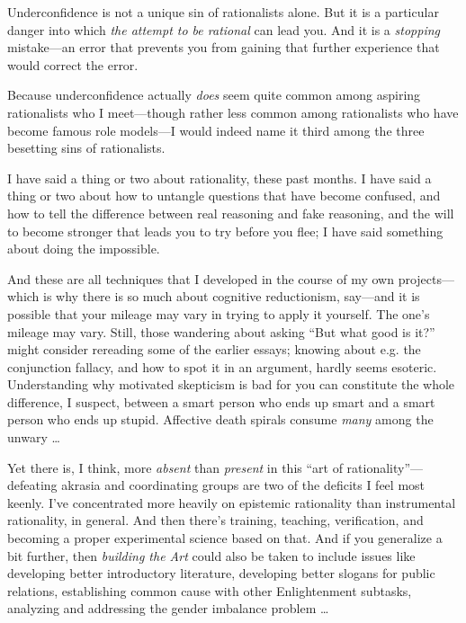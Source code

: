 {
 Underconfidence is not a unique sin of rationalists alone. But it
is a particular danger into which \textit{the attempt to be rational}
can lead you. And it is a \textit{stopping} mistake---an error that
prevents you from gaining that further experience that would correct
the error.}

{
 Because underconfidence actually \textit{does} seem quite common
among aspiring rationalists who I meet---though rather less common
among rationalists who have become famous role models---I would indeed
name it third among the three besetting sins of rationalists.}

\myendsectiontext


{
 I have said a thing or two about rationality, these past months. I
have said a thing or two about how to untangle questions that have
become confused, and how to tell the difference between real reasoning
and fake reasoning, and the will to become stronger that leads you to
try before you flee; I have said something about doing the impossible.
}

{
 And these are all techniques that I developed in the course of my
own projects---which is why there is so much about cognitive
reductionism, say---and it is possible that your mileage may vary in
trying to apply it yourself. The one's mileage may
vary. Still, those wandering about asking ``But what
good is it?'' might consider rereading some of the
earlier essays; knowing about e.g. the conjunction fallacy, and how to
spot it in an argument, hardly seems esoteric. Understanding why
motivated skepticism is bad for you can constitute the whole
difference, I suspect, between a smart person who ends up smart and a
smart person who ends up stupid. Affective death spirals consume
\textit{many} among the unwary \ldots}

{
 Yet there is, I think, more \textit{absent} than \textit{present}
in this ``art of
rationality''---defeating akrasia and coordinating
groups are two of the deficits I feel most keenly. I've
concentrated more heavily on epistemic rationality than instrumental
rationality, in general. And then there's training,
teaching, verification, and becoming a proper experimental science
based on that. And if you generalize a bit further, then
\textit{building the Art} could also be taken to include issues like
developing better introductory literature, developing better slogans
for public relations, establishing common cause with other
Enlightenment subtasks, analyzing and addressing the gender imbalance
problem \ldots}

